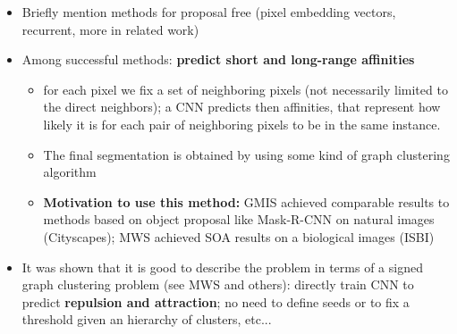 \documentclass[10pt,twocolumn,letterpaper]{article}
\begin{document}
\begin{itemize}
\item Briefly mention methods for proposal free (pixel embedding vectors, recurrent, more in related work)

\item Among successful methods: \textbf{predict short and long-range affinities}
\begin{itemize}
\item for each pixel we fix a set of neighboring pixels (not necessarily limited to the direct neighbors);  a CNN predicts then affinities, that represent how likely it is for each pair of neighboring pixels to be in the same instance.
\item The final segmentation is obtained by using some kind of graph clustering algorithm
\item \textbf{Motivation to use this method:} GMIS achieved comparable results to methods based on object proposal like Mask-R-CNN on natural images (Cityscapes);  MWS achieved SOA results on a biological images (ISBI)
\end{itemize}
\item It was shown that it is good to describe the problem in terms of a signed graph clustering problem (see MWS and others): directly train CNN to predict \textbf{repulsion and attraction}; no need to define seeds or to fix a threshold given an hierarchy of clusters, etc...



\end{itemize}
\end{document}
